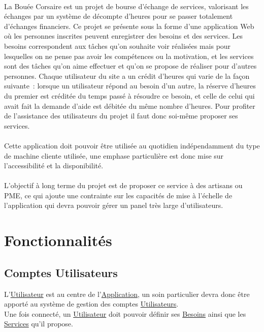 \documentclass[french,12pt]{article}
\begin{document}
		\paragraph{}
			La Bouée Corsaire est un projet de bourse d’échange de services,
			 valorisant les échanges par un système de décompte d’heures pour se
			 passer totalement d’échanges financiers. Ce projet se présente sous la
			 forme d’une application Web où les personnes inscrites peuvent
			 enregistrer des besoins et des services. Les besoins correspondent aux
			 tâches qu’on souhaite voir réalisées mais pour lesquelles on ne pense pas
			 avoir les compétences ou la motivation, et les services sont des tâches
			 qu’on aime effectuer et qu’on se propose de réaliser pour d’autres
			 personnes. Chaque utilisateur du site a un crédit d’heures qui varie de
			 la façon suivante : lorsque un utilisateur répond au besoin d’un autre,
			 la réserve d’heures du premier est créditée du temps passé à résoudre ce
			 besoin, et celle de celui qui avait fait la demande d’aide est débitée du
			 même nombre d’heures. Pour profiter de l’assistance des utilisateurs du
			 projet il faut donc soi-même proposer ses services.
		\paragraph{}
			Cette application doit pouvoir être utilisée au quotidien indépendamment
			 du type de machine cliente utilisée, une emphase particulière est donc
			 mise sur l’accessibilité et la disponibilité.
		\paragraph{}
			L’objectif à long terme du projet est de proposer ce service à des
			 artisans ou PME, ce qui ajoute une contrainte sur les capacités de mise à
			 l’échelle de l’application qui devra pouvoir gérer un panel très large
			 d’utilisateurs.

	\newpage
	\section{Fonctionnalités}
		\localtableofcontents

		\newpage
		\subsection{Comptes Utilisateurs}

			L’\hyperlink{utilisateur}{Utilisateur} est au centre de
			 l’\hyperlink{application}{Application}, un soin particulier devra donc
			 être apporté au système de gestion des comptes
			 \hyperlink{utilisateur}{Utilisateurs}.\\
			Une fois connecté, un \hyperlink{utilisateur}{Utilisateur} doit pouvoir
			 définir ses \hyperlink{besoin}{Besoins} ainsi que les
			 \hyperlink{service}{Services} qu’il propose.\\
\end{document}
